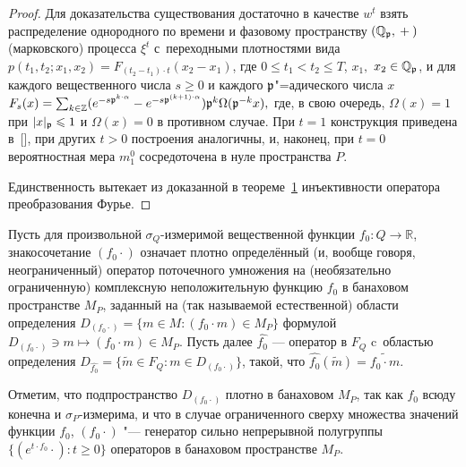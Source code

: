 \smallskip

\begin{proof}
  Для доказательства существования достаточно в качестве $w^t$
 взять распределение %
 однородного по времени и фазовому пространству $(\mathbb Q_{\mathfrak p}, {}+{})$
 (марковского) процесса $\xi^t$
 с~переходными плотностями вида
 $  p(t_1,t_2;x_1,x_2)  =     F_{(t_2-t_1)\cdot t}(x_2-x_1)  $,
где $0\leqslant  t_1<t_2\leqslant  T$, $x_1,$ $x_2\in\mathbb Q_{\mathfrak p}$,   и для каждого вещественного числа $s\geqslant 0$
и каждого ${\mathfrak p}$"=адического числа $x$  $
 F_s(x)
 =
 \sum_{k\in\mathbb Z}
               (e^{-s{\mathfrak p}^{k\cdot\alpha}}-e^{-s{\mathfrak p}^{(k+1)\cdot\alpha}})
               {\mathfrak p}^{k}\Omega ( {\mathfrak p}^{-k}x ),
 $
 где, в свою очередь, $ \Omega (x)=1$ при $|x|_{\mathfrak p}\leqslant 1$
 и $\Omega(x)=0 $ в противном случае.
 При $t=1$ конструкция приведена в~[],
 при других $t>0$ построения аналогичны,
 и, наконец, при $t=0$ вероятностная мера $m_1^0$
 сосредоточена в нуле пространства $P$.


  Единственность
 вытекает из доказанной в теореме~\hyperlink{sham:th:1}{1}  инъективности оператора
 преобразования Фурье.
\end{proof}

\smallskip 


 \begin{definition}
Пусть для произвольной  $ \sigma _Q$-измеримой  вещественной функции  $ f_0 : Q\to{\mathbb R} $, знакосочетание
 $(f_0 \cdot)$ означает  плотно определённый  (и,   вообще говоря, неограниченный)   оператор
  поточечного умножения 
  на
   (необязательно
  ограниченную)
  комплексную
 неположительную функцию $f_0 $  в банаховом пространстве  $M_P$,
 заданный
 на  (так называемой естественной) области определения  $D_{(f_0 \cdot)}=\{m\in M: (f_0 \cdot m)\in M_P  \}$  формулой
 $
 D_{(f_0 \cdot)}\ni m\mapsto {(f_0 \cdot m)}\in M_P.
 $
 Пусть  далее
 $\widehat {f_0 }$ --- оператор в $F_Q$  c~областью определения
 $
 D_{\widehat{ f_0  }}
 =
 \{ \widetilde m\in F_Q : m\in  D_{(f_0 \cdot)}  \}
 $,
 такой, что
 $ \widehat{ f_0  } (\widetilde m)= \widetilde{ f_0 \cdot m }$.
 \end{definition}


\smallskip

  Отметим, что
  подпространство
  $
  D_{(f_0 \cdot)}
    $
  плотно в банаховом $M_P$,
   так как $f_0$ всюду конечна и  $\sigma _P$-измерима,
  и что в случае ограниченного сверху множества значений
  функции $f_0$,
  $(f_0 \cdot)$ "--- генератор сильно непрерывной полугруппы
  $\{(e^{t\cdot f_0}\cdot): t\geqslant 0\}$
  операторов в банаховом пространстве $M_P$.


